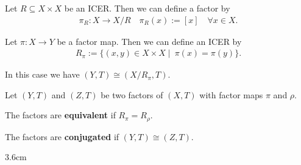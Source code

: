 \begin{frame}
	\begin{proposition}
		Let $R \subseteq X \times X$ be an ICER. Then we can define a factor by
		\begin{align*}
			\pi_R: X \to X/R \quad \pi_R(x) := [x] \quad \forall x \in X.
		\end{align*}\pause
	
		Let $\pi: X \to Y$ be a factor map. Then we can define an ICER by
		\begin{align*}
			R_\pi := \{(x, y) \in X \times X \mid \ \pi(x) = \pi(y)\}.
		\end{align*}\pause
	
		In this case we have $(Y, T) \cong (X/R_\pi, T)$.\pause
	\end{proposition}
	\begin{definition}
		Let $(Y, T)$ and $(Z, T)$ be two factors of $(X, T)$ with factor maps $\pi$ and $\rho$.
		
		The factors are \textbf{equivalent} if $R_\pi = R_\rho$.\pause
		
		The factors are \textbf{conjugated} if $(Y, T) \cong (Z, T)$.
	\end{definition}
\end{frame}

\begin{frame}
	\begin{overlayarea}{\textwidth}{3.6cm}
	\begin{minipage}{\textwidth}
	\end{minipage}
	\end{overlayarea}
\end{frame}

